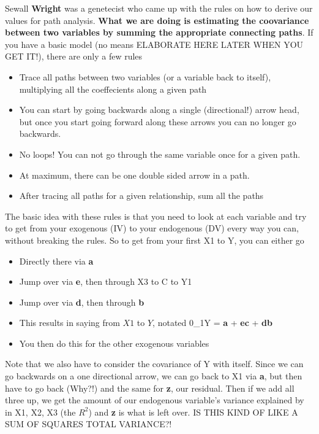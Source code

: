 \documentclass[]{book}
\providecommand{\tightlist}{%
  \setlength{\itemsep}{0pt}\setlength{\parskip}{0pt}}
\theoremstyle{definition}
\theoremstyle{definition}
\theoremstyle{definition}
\theoremstyle{remark}
\begin{document}
Sewall \textbf{Wright} was a genetecist who came up with the rules on
how to derive our values for path analysis. \textbf{What we are doing is
estimating the coovariance between two variables by summing the
appropriate connecting paths}. If you have a basic model (no means
ELABORATE HERE LATER WHEN YOU GET IT!), there are only a few rules

\begin{itemize}
\tightlist
\item
  Trace all paths between two variables (or a variable back to itself),
  multiplying all the coeffecients along a given path
\item
  You can start by going backwards along a single (directional!) arrow
  head, but once you start going forward along these arrows you can no
  longer go backwards.
\item
  No loops! You can not go through the same variable once for a given
  path.
\item
  At maximum, there can be one double sided arrow in a path.
\item
  After tracing all paths for a given relationship, sum all the paths
\end{itemize}

The basic idea with these rules is that you need to look at each
variable and try to get from your exogenous (IV) to your endogenous (DV)
every way you can, without breaking the rules. So to get from your first
X1 to Y, you can either go

\begin{itemize}
\tightlist
\item
  Directly there via \textbf{a}
\item
  Jump over via \textbf{e}, then through X3 to C to Y1
\item
  Jump over via \textbf{d}, then through \textbf{b}
\item
  This results in saying from \(X1\) to \(Y\), notated 0\_1Y =
  \textbf{a} + \textbf{ec} + \textbf{db}
\item
  You then do this for the other exogenous variables
\end{itemize}

Note that we also have to consider the covariance of Y with itself.
Since we can go backwards on a one directional arrow, we can go back to
X1 via \textbf{a}, but then have to go back (Why?!) and the same for
\textbf{z}, our residual. Then if we add all three up, we get the amount
of our endogenous variable's variance explained by in X1, X2, X3 (the
\(R^2\)) and \textbf{z} is what is left over. IS THIS KIND OF LIKE A SUM
OF SQUARES TOTAL VARIANCE?!
\end{document}
